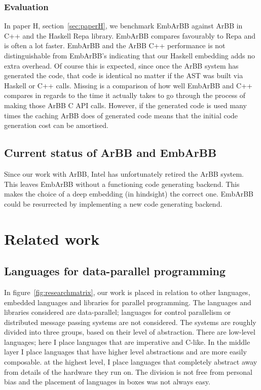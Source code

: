 \documentclass[a4paper]{book}
\begin{document}
\subsubsection{Evaluation} 

In paper H, section~\ref{sec:paperH}, we benchmark EmbArBB against ArBB in C++ and the Haskell 
Repa library. EmbArBB compares favourably to Repa and is often a lot faster. EmbArBB and the ArBB 
C++ performance is not distinguishable from EmbArBB's indicating that our Haskell embedding 
adds no extra overhead. Of course this is expected, since once the ArBB system has generated 
the code, that code is identical no matter if the AST was built via Haskell or C++ calls. 
Missing is a comparison of how well EmbArBB and C++ compares in regards to the time it actually 
takes to go through the process of making those ArBB C API calls. However, if the generated 
code is used many times the caching ArBB does of generated code means that the initial code 
generation cost can be amortised. 

\subsection{Current status of ArBB and EmbArBB} 

Since our work with ArBB, Intel has unfortunately retired the ArBB system. This 
leaves EmbArBB without a functioning code generating backend. This makes the choice of a
deep embedding (in hindsight) the correct one. EmbArBB could be resurrected by implementing 
a new code generating backend. 


%
%
\section{Related work} 
\label{sec:relatedwork}
\FloatBarrier


\subsection{Languages for data-parallel programming}

In figure~\ref{fig:researchmatrix}, our work is placed in relation to other languages,
embedded languages and libraries for parallel programming. The languages and libraries considered 
are data-parallel; languages for control parallelism or distributed message passing systems are 
not considered. The systems are roughly divided 
into three groups, based on their level of abstraction. There are low-level languages; here 
I place languages that are imperative and C-like. In the middle layer I place languages 
that have higher level abstractions and are more easily composable. 
at the highest level, I place languages that completely abstract away from details of the 
hardware they run on. The division is not free from personal bias and the placement of languages
in boxes was not always easy. 
\end{document}

